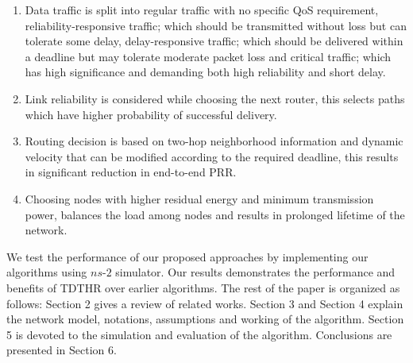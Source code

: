 \documentclass[fleqn,twoside]{article}
\begin{document}
\begin{enumerate}
\item
Data traffic is split into regular traffic with no specific QoS requirement, reliability-responsive traffic; which should be transmitted without loss but can tolerate some delay, delay-responsive traffic; which should be delivered within a deadline but may tolerate moderate packet loss and critical traffic; which has high significance and demanding both high reliability and short delay.
\item
Link reliability is considered while choosing the next router, this selects paths which have higher probability of successful delivery.
\item
Routing decision is based on two-hop neighborhood information and dynamic velocity that can be modified according to the required deadline, this results in significant reduction in end-to-end PRR.
\item
Choosing nodes with higher residual energy and minimum transmission power, balances the load among nodes 
and results in prolonged lifetime of the network.
\end{enumerate}

We test the performance of our proposed approaches by implementing our algorithms using $ns$-$2$ simulator. Our results
demonstrates the performance and benefits of TDTHR over earlier algorithms.
\vskip 2mm
The rest of the paper is organized as follows: Section 2 gives a review of related works. Section 3 and Section 4 explain the network model, notations, assumptions and working of the algorithm. Section 5 is devoted to the simulation and evaluation of the algorithm. Conclusions are presented in Section 6.
\end{document}
